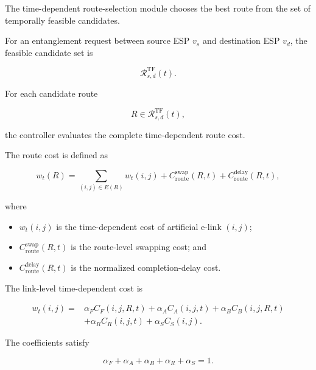 The time-dependent route-selection module chooses the best route from the set of temporally feasible candidates.

For an entanglement request between source ESP $v_s$ and destination ESP $v_d$, the feasible candidate set is

\begin{equation}
    \mathcal{R}_{s,d}^{\mathrm{TF}}(t).
\end{equation}

For each candidate route

\begin{equation}
    R
    \in
    \mathcal{R}_{s,d}^{\mathrm{TF}}(t),
\end{equation}

the controller evaluates the complete time-dependent route cost.

The route cost is defined as

\begin{equation}
    w_t(R)
    =
    \sum_{
    (i,j)
    \in
    E(R)
    }
    w_t(i,j)
    +
    C_{\mathrm{route}}^{\mathrm{swap}}(R,t)
    +
    C_{\mathrm{route}}^{\mathrm{delay}}(R,t),
\end{equation}

where

\begin{itemize}
    \item $w_t(i,j)$ is the time-dependent cost of artificial e-link $(i,j)$;
    \item $C_{\mathrm{route}}^{\mathrm{swap}}(R,t)$ is the route-level swapping cost; and
    \item $C_{\mathrm{route}}^{\mathrm{delay}}(R,t)$ is the normalized completion-delay cost.
\end{itemize}

The link-level time-dependent cost is

\begin{equation}
\begin{aligned}
    w_t(i,j)
    ={}&
    \alpha_F C_F(i,j,R,t)
    +
    \alpha_A C_A(i,j,t)
    +
    \alpha_B C_B(i,j,R,t)
    \\
    &+
    \alpha_R C_R(i,j,t)
    +
    \alpha_S C_S(i,j).
\end{aligned}
\end{equation}

The coefficients satisfy

\begin{equation}
    \alpha_F
    +
    \alpha_A
    +
    \alpha_B
    +
    \alpha_R
    +
    \alpha_S
    =
    1.
\end{equation}

